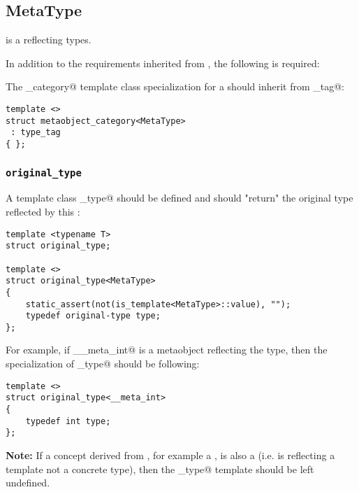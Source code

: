 \subsection{MetaType}
\label{concept-MetaType}


 is a  reflecting types.

In addition to the requirements inherited from , the following is required:

The \verb@metaobject_category@ template class specialization for a  should
inherit from \verb@type_tag@:

\begin{verbatim}
template <>
struct metaobject_category<MetaType>
 : type_tag
{ };
\end{verbatim}

\subsubsection{\texttt{original\_type}}

A template class \verb@original_type@ should be defined and should "return"
the original type reflected by this :

\begin{verbatim}
template <typename T>
struct original_type;

template <>
struct original_type<MetaType>
{
	static_assert(not(is_template<MetaType>::value), "");
	typedef original-type type;
};
\end{verbatim}

For example, if \verb@__meta_int@ is a metaobject reflecting the \verb@int@ type,
then the specialization of \verb@original_type@ should be following:

\begin{verbatim}
template <>
struct original_type<__meta_int>
{
	typedef int type;
};
\end{verbatim}

\textbf{Note:} If a concept derived from , for example a ,
is also a  (i.e. is reflecting a template not a concrete type),
then the \verb@original_type@ template should be left undefined.

